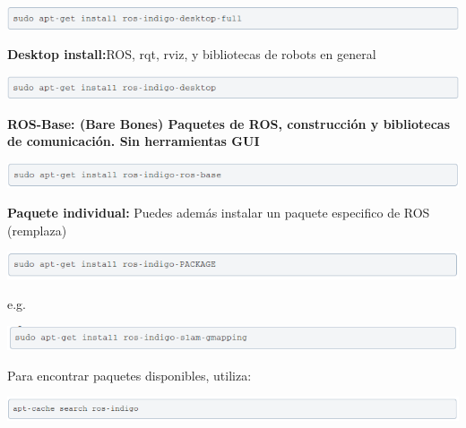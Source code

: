 \documentclass[a4paper]{book}
\begin{document}
\begin{center}
\includegraphics[width=1\textwidth]{Figures/Software/Install_ROS/Paso_7.png}
\end{center}

\textbf{Desktop install:}ROS, rqt, rviz, y bibliotecas de robots en general

\begin{center}
\includegraphics[width=1\textwidth]{Figures/Software/Install_ROS/Paso_8.png}
\end{center}

\textbf{ROS-Base: (Bare Bones) Paquetes de ROS, construcción y bibliotecas de comunicación. Sin herramientas GUI}

\begin{center}
\includegraphics[width=1\textwidth]{Figures/Software/Install_ROS/Paso_9.png}
\end{center}

\textbf{Paquete individual:} Puedes además instalar un paquete especifico de ROS (remplaza)

\begin{center}
\includegraphics[width=1\textwidth]{Figures/Software/Install_ROS/Paso_10.png}
\end{center}

e.g.

\begin{center}
\includegraphics[width=1\textwidth]{Figures/Software/Install_ROS/Paso_11.png}
\end{center}

Para encontrar paquetes disponibles, utiliza:

\begin{center}
\includegraphics[width=1\textwidth]{Figures/Software/Install_ROS/Paso_12.png}
\end{center}
\end{document}
